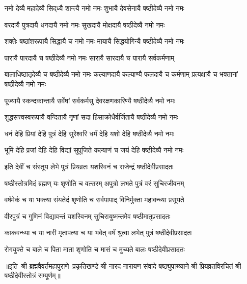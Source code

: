 

\twolineshloka
{नमो देव्यै महादेव्यै सिद्‍ध्यै शान्त्यै नमो नमः}
{शुभायै देवसेनायै षष्ठीदेव्यै नमो नमः}%

\twolineshloka
{वरदायै पुत्रदायै धनदायै नमो नमः}
{सुखदायै मोक्षदायै षष्ठीदेव्यै नमो नमः}%

\twolineshloka
{शक्तेः षष्ठांशरूपायै सिद्धायै च नमो नमः}
{मायायै सिद्धयोगिन्यै षष्ठीदेव्यै नमो नमः}%

\twolineshloka
{पारायै पारदायै च षष्ठीदेव्यै नमो नमः}
{सारायै सारदायै च पारायै सर्वकर्मणाम्}%

\threelineshloka
{बालाधिष्ठातृदेव्यै च षष्ठीदेव्यै नमो नमः}
{कल्याणदायै कल्याण्यै फलदायै च कर्मणाम्}
{प्रत्यक्षायै च भक्तानां षष्ठीदेव्यै नमो नमः}%

\twolineshloka
{पूज्यायै स्कन्दकान्तायै सर्वेषां सर्वकर्मसु}
{देवरक्षणकारिण्यै षष्ठीदेव्यै नमो नमः}%

\twolineshloka
{शुद्धसत्त्वस्वरूपायै वन्दितायै नृणां सदा}
{हिंसाक्रोधैर्वर्जितायै षष्ठीदेव्यै नमो नमः}%

\twolineshloka
{धनं देहि प्रियां देहि पुत्रं देहि सुरेश्वरि}
{धर्मं देहि यशो देहि षष्ठीदेव्यै नमो नमः}%

\twolineshloka
{भूमिं देहि प्रजां देहि देहि विद्यां सुपूजिते}
{कल्याणं च जयं देहि षष्ठीदेव्यै नमो नमः}%

\twolineshloka
{इति देवीं च संस्तूय लेभे पुत्रं प्रियव्रतः}
{यशस्विनं च राजेन्द्रं षष्ठीदेवीप्रसादतः}%

\twolineshloka
{षष्ठीस्तोत्रमिदं ब्रह्मण् यः शृणोति च वत्सरम्}
{अपुत्रो लभते पुत्रं वरं सुचिरजीवनम्}

\twolineshloka
{वर्षमेकं च या भक्त्या संयतेदं शृणोति च}
{सर्वपापाद् विनिर्मुक्ता महावन्ध्या प्रसूयते}

\twolineshloka
{वीरपुत्रं च गुणिनं विद्यावन्तं यशस्विनम्}
{सुचिरायुष्मन्तमेव षष्ठीमातृप्रसादतः}

\twolineshloka
{काकवन्ध्या च या नारी मृतापत्या च या भवेत्}
{वर्षं श्रुत्वा लभेत् पुत्रं षष्ठीदेवीप्रसादतः}

\twolineshloka
{रोगयुक्ते च बाले च पिता माता शृणोति च}
{मासं  च मुच्यते बालः षष्ठीदेवीप्रसादतः}

{॥इति~श्री-ब्रह्मवैवर्तमहापुराणे~प्रकृतिखण्डे श्री-नारद-नारायण-संवादे षष्ठ्युपाख्याने श्री-प्रियव्रतविरचितं श्री-षष्ठीदेवीस्तोत्रं सम्पूर्णम्॥}